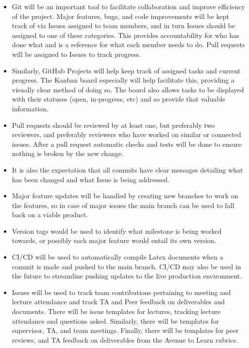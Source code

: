 \documentclass{article}
\begin{document}
\begin{itemize}
	\item Git will be an important tool to facilitate collaboration and improve efficiency of the project. Major features, bugs, and code improvements will be kept track of via Issues assigned to team members, and in turn Issues should be assigned to one of these categories. This provides accountability for who has done what and is a reference for what each member needs to do. Pull requests will be assigned to Issues to track progress.
	\item Similarly, GitHub Projects will help keep track of assigned tasks and current progress. The Kanban board especially will help facilitate this, providing a visually clear method of doing so. The board also allows tasks to be displayed with their statuses (open, in-progress, etc) and so provide that valuable information.
    \item Pull requests should be reviewed by at least one, but preferably two reviewers, and preferably reviewers who have worked on similar or connected issues. After a pull request automatic checks and tests will be done to ensure nothing is broken by the new change.
    \item It is also the expectation that all commits have clear messages detailing what has been changed and what Issue is being addressed.
    \item Major feature updates will be handled by creating new branches to work on the features, so in case of major issues the main branch can be used to fall back on a viable product.
    \item Version tags would be used to identify what milestone is being worked towards, or possibly each major feature would entail its own version.
    \item CI/CD will be used to automatically compile Latex documents when a commit is made and pushed to the main branch. CI/CD may also be used in the future to streamline pushing updates to the live production environment.
    \item Issues will be used to track team contributions pertaining to meeting and lecture attendance and track TA and Peer feedback on deliverables and documents. There will be issue templates for lectures, tracking lecture attendance and questions asked. Similarly, there will be templates for supervisor, TA, and team meetings. Finally, there will be templates for peer reviews, and TA feedback on deliverables from the Avenue to Learn rubrics.
\end{itemize}
\end{document}
